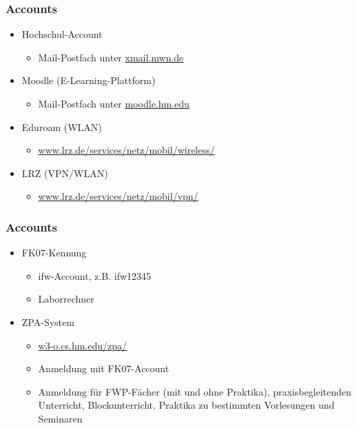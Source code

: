 \documentclass{beamer}
\begin{document}
	\begin{frame}[t]
		\frametitle{Accounts}
		\begin{itemize}
			\item Hochschul-Account
			\begin{itemize}
				\item Mail-Postfach unter \url{xmail.mwn.de}
			\end{itemize}
			\pause
			\item Moodle (E-Learning-Plattform)
			\begin{itemize}
				\item Mail-Postfach unter \url{moodle.hm.edu}
			\end{itemize}
			\pause
			\item Eduroam (WLAN)
			\begin{itemize}
				\item \url{www.lrz.de/services/netz/mobil/wireless/}
			\end{itemize}
			\pause
			\item LRZ (VPN/WLAN)
			\begin{itemize}
				\item \url{www.lrz.de/services/netz/mobil/vpn/}
			\end{itemize}
		\end{itemize}
	\end{frame}
	
	\begin{frame}[t]
		\frametitle{Accounts}
		\begin{itemize}
			\item FK07-Kennung
			\begin{itemize}
				\item ifw-Account, z.B. ifw12345
				\item Laborrechner
			\end{itemize}
			\pause
			\item ZPA-System
			\begin{itemize}
				\item \url{w3-o.cs.hm.edu/zpa/}
				\item Anmeldung mit FK07-Account
				\item Anmeldung für FWP-Fächer (mit und ohne Praktika),
				praxisbegleitenden Unterricht,
				Blockunterricht,
				Praktika zu bestimmten Vorlesungen und
				Seminaren
			\end{itemize}
		\end{itemize}
	\end{frame}
	
\end{document}
